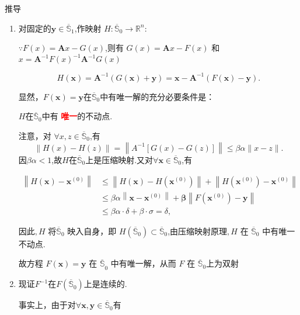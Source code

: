 \documentclass{lzureport}
\begin{document}
\begin{derivation}{推导}
	\begin{enumerate}[itemindent=1em,label=\arabic*)]
	
	\item 对固定的$\boldsymbol{y}\in \overline {\mathbb{S} }_1$,作映射 $H:\overline{\mathbb{S}}_0\to\mathbb{R}^n:$

	$\because F(x)=\boldsymbol{A}x-G(x)$,则有 $G(x) = \boldsymbol{A}x - F(x)$ 和 $x = \boldsymbol{A}^{-1} F(x)^{-1}\boldsymbol{A}^{-1}G(x)$

	$$H(\boldsymbol{x})=\boldsymbol{A}^{-1}(G(\boldsymbol{x})+\boldsymbol{y})=\boldsymbol{x}-\boldsymbol{A}^{-1}(F(\boldsymbol{x})-\boldsymbol{y}).$$

	显然，$F(\boldsymbol{x})=\boldsymbol{y}$在$\overline{\mathbb{S}}_0$中有唯一解的\textcolor{YBXPurple}{充分必要}条件是：

	$H$在$\overline{\mathbb{S}}_0$中有 \textcolor{red}{\textbf{唯一}}的不动点. 

	注意，对 $\forall x,z\in\overline{\mathbb{S}}_0$,有
	$$\|H(x)-H(z)\|=\left\|A^{-1}[G(x)-G(z)]\right\|\leqslant\beta\alpha\|x-z\|.$$
	因$\beta\alpha<1$,故$H$在$\overline{\mathbb{S}}_0$上是压缩映射.又对$\forall\boldsymbol{x}\in\overline{\mathbb{S}}_0$,有

	$$\begin{aligned}
	\left\|H(\boldsymbol{x})-\boldsymbol{x}^{(0)}\right\|&\leqslant\left\|H(\boldsymbol{x})-H\left(\boldsymbol{x}^{(0)}\right)\right\|+\left\|H\left(\boldsymbol{x}^{(0)}\right)-\boldsymbol{x}^{(0)}\right\|\\
	&\leqslant\beta\alpha\left\|\boldsymbol{x}-\boldsymbol{x}^{(0)}\right\|+\boldsymbol{\beta}\left\|F\left(\boldsymbol{x}^{(0)}\right)-\boldsymbol{y}\right\|\\
	&\leqslant\beta\alpha\cdot\delta+\beta\cdot\sigma=\delta,
	\end{aligned}$$

	因此$,H$ 将$\overline{\mathbb{S}}_0$ 映入自身，即 $H\left(\overline{\mathbb{S}}_0\right)\subset\overline{\mathbb{S}}_0$,由压缩映射原理$,H$ 在 $\overline{\mathbb{S}}_0$ 中有唯一不动点. 

	故方程 $F(\boldsymbol{x})=\boldsymbol{y\text{ 在 }\overline{\mathbb{S}}}_0$ 中有唯一解，从而 $F$ 在 $\overline{\mathbb{S}}_0$上为双射

	\item 现证$F^{-1}$在$F\left(\overline{\mathbb{S}}_0\right)$上是连续的.
	
	事实上，由于对$\forall\boldsymbol x,\boldsymbol y\in\overline{\mathbb{S}}_0$有


\end{enumerate}
\end{derivation}
\end{document}
